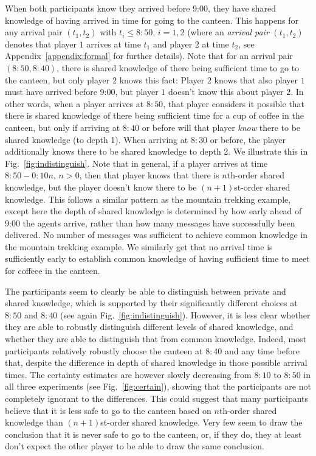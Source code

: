 When both participants know they arrived before 9:00, they have shared knowledge of having arrived in time for going to the canteen. This happens for any arrival pair $(t_1,t_2)$ with $t_i \leq 8{:}50$, $i=1,2$ (where an \emph{arrival pair} $(t_1,t_2)$ denotes that player $1$ arrives at time $t_1$ and player $2$ at time $t_2$, see Appendix~\ref{appendix:formal} for further details). Note that for an arrival pair $(8{:}50,8{:}40)$, there is shared knowledge of there being sufficient time to go to the canteen, but only player $2$ knows this fact: Player $2$ knows that also player $1$ must have arrived before 9{:}00, but player $1$ doesn't know this about player $2$. In other words, when a player arrives at $8{:}50$, that player considers it possible that there is shared knowledge of there being sufficient time for a cup of coffee in the canteen, but only if arriving at $8{:}40$ or before will that player \emph{know} there to be shared knowledge (to depth 1). When arriving at $8{:}30$ or before, the player additionally knows there to be shared knowledge to depth 2. We illustrate this in Fig.~\ref{fig:indistinguish}. Note that in general, if a player arrives at time $8{:}50-0{:}10n$, $n>0$, then that player knows that there is $n$th-order shared knowledge, but the player doesn't know there to be $(n+1)$st-order shared knowledge. This follows a similar pattern as the mountain trekking example, except here the depth of shared knowledge is determined by how early ahead of 9:00 the agents arrive, rather than how many messages have successfully been delivered. No number of messages was sufficient to achieve common knowledge in the mountain trekking example. We similarly get that no arrival time is sufficiently early to establish common knowledge of having sufficient time to meet for coffeee in the canteen. 


The participants seem to clearly be able to distinguish between private and shared knowledge, which is supported by their significantly different choices at $8{:}50$ and $8{:}40$ (see again Fig.~\ref{fig:indistinguish}). However, it is less clear whether they are able to robustly distinguish different levels of shared knowledge, and whether they are able to distinguish that from common knowledge. Indeed, most participants relatively robustly choose the canteen at $8{:}40$ and any time before that, despite the difference in depth of shared knowledge in those possible arrival times. The certainty estimates are however slowly decreasing from $8{:}10$ to $8{:}50$ in all three experiments (see Fig.~\ref{fig:certain}), showing that the participants are not completely ignorant to the differences. This could suggest that many participants believe that it is less safe to go to the canteen based on $n$th-order shared knowledge than $(n+1)$st-order shared knowledge. Very few seem to draw the conclusion that it is never safe to go to the canteen, or, if they do, they at least don't expect the other player to be able to draw the same conclusion. 

